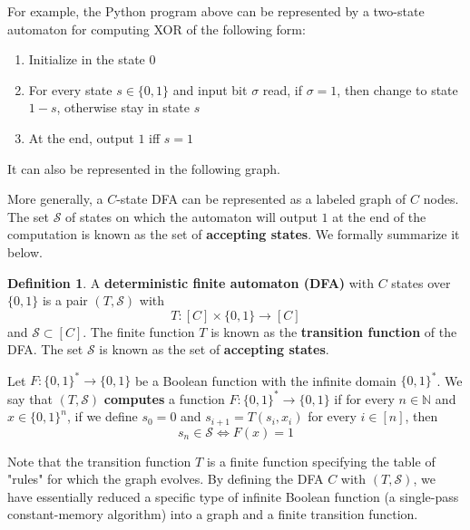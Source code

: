 \documentclass[a4paper, 12pt]{report}
\theoremstyle{remark}
\theoremstyle{definition}
\newtheorem{definition}{Definition}[section]
\begin{document}
For example, the Python program above can be represented by a two-state automaton for computing XOR of the following form:
\begin{enumerate}
    \item Initialize in the state 0
    \item For every state $s \in \{0,1\}$ and input bit $\sigma$ read, if $\sigma = 1$, then change to state $1-s$, otherwise stay in state $s$
    \item At the end, output $1$ iff $s = 1$
\end{enumerate}
It can also be represented in the following graph. 
\begin{center}
\end{center}
More generally, a $C$-state DFA can be represented as a labeled graph of $C$ nodes. The set $\mathcal{S}$ of states on which the automaton will output $1$ at the end of the computation is known as the set of \textbf{accepting states}. We formally summarize it below. 

\begin{definition}
A \textbf{deterministic finite automaton (DFA)} with $C$ states over $\{0, 1\}$ is a pair $(T, \mathcal{S})$ with
\[T: [C] \times \{0,1\} \longrightarrow [C]\]
and $\mathcal{S} \subset [C]$. The finite function $T$ is known as the \textbf{transition function} of the DFA. The set $\mathcal{S}$ is known as the set of \textbf{accepting states}. 

Let $F: \{0,1\}^* \longrightarrow \{0,1\}$ be a Boolean function with the infinite domain $\{0,1\}^*$. We say that $(T, \mathcal{S})$ \textbf{computes} a function $F: \{0,1\}^* \longrightarrow \{0,1\}$ if for every $n \in \mathbb{N}$ and $x \in \{0,1\}^n$, if we define $s_0 = 0$ and $s_{i+1} = T(s_i, x_i)$ for every $i \in [n]$, then 
\[s_n \in \mathcal{S} \iff F(x) = 1\]
\end{definition}

Note that the transition function $T$ is a finite function specifying the table of "rules" for which the graph evolves. By defining the DFA $C$ with $(T, \mathcal{S})$, we have essentially reduced a specific type of infinite Boolean function (a single-pass constant-memory algorithm) into a graph and a finite transition function. 
\end{document}
